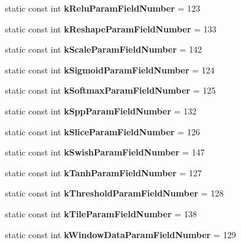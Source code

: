 \begin{DoxyCompactItemize}
static const int {\bfseries k\+Relu\+Param\+Field\+Number} = 123
\item 
\mbox{\label{classcaffe_1_1_layer_parameter_afc49b87717457d4df944b2f98967d002}} 
static const int {\bfseries k\+Reshape\+Param\+Field\+Number} = 133
\item 
\mbox{\label{classcaffe_1_1_layer_parameter_a74cee6ccc5faf57538fc27e2c0eda388}} 
static const int {\bfseries k\+Scale\+Param\+Field\+Number} = 142
\item 
\mbox{\label{classcaffe_1_1_layer_parameter_a54698c7d314a9f95b82a5ad49a66d382}} 
static const int {\bfseries k\+Sigmoid\+Param\+Field\+Number} = 124
\item 
\mbox{\label{classcaffe_1_1_layer_parameter_afd1d7ebf7f255e4306da48c3df3287a2}} 
static const int {\bfseries k\+Softmax\+Param\+Field\+Number} = 125
\item 
\mbox{\label{classcaffe_1_1_layer_parameter_a80236b99a60a3b6a8fe94e8f3c0ad9a9}} 
static const int {\bfseries k\+Spp\+Param\+Field\+Number} = 132
\item 
\mbox{\label{classcaffe_1_1_layer_parameter_a637d3ac5d921eb6291e2e471227e458b}} 
static const int {\bfseries k\+Slice\+Param\+Field\+Number} = 126
\item 
\mbox{\label{classcaffe_1_1_layer_parameter_abaa0d3c4de084bdc280aafc09c49ed05}} 
static const int {\bfseries k\+Swish\+Param\+Field\+Number} = 147
\item 
\mbox{\label{classcaffe_1_1_layer_parameter_aca67dbe65cb1118538a91e455c29ffde}} 
static const int {\bfseries k\+Tanh\+Param\+Field\+Number} = 127
\item 
\mbox{\label{classcaffe_1_1_layer_parameter_aa6ee4d7ac4b7201fbc260e814996ed7b}} 
static const int {\bfseries k\+Threshold\+Param\+Field\+Number} = 128
\item 
\mbox{\label{classcaffe_1_1_layer_parameter_aacea737123fa4f79af4ab5b996a0acf4}} 
static const int {\bfseries k\+Tile\+Param\+Field\+Number} = 138
\item 
\mbox{\label{classcaffe_1_1_layer_parameter_ac8582da831fa7d2adb5480174a870957}} 
static const int {\bfseries k\+Window\+Data\+Param\+Field\+Number} = 129
\end{DoxyCompactItemize}
